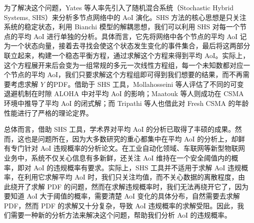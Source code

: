 为了解决这个问题，Yates 等人率先引入了随机混合系统（Stochastic Hybrid Systems, SHS）来分析多节点网络中的 AoI 演化\cite{yates2018age}。SHS 方法的核心思想是只关注系统的稳定状态，利用 Bianchi 模型的解耦思想，我们可以利用 SHS 对每一个节点的平均 AoI 进行单独的分析。具体而言，它先将网络中各个节点的平均 AoI 记为一个状态向量，接着去寻找会使这个状态发生变化的事件集合，最后将这两部分联立起来，构建一个稳态平衡方程，通过求解这个方程来得到平均 AoI。实际上，这个方程展开来后会变为一组常规的多元一次线性方程组，每一个未知数都对应一个节点的平均 AoI，我们只要求解这个方程组即可得到我们想要的结果，而不再需要考虑求解 $Y$ 的PDF。借助于 SHS 工具，Mollahosseini 等人评估了不同的可变退避机制在时隙 ALOHA 中对平均 AoI 的影响\cite{mollahosseini2024effect}；Maatouk 等人则成功在 CSMA 环境中推导了平均 AoI 的闭式解\cite{maatouk2020age}；而 Tripathi 等人也借此对 Fresh CSMA 的年龄性能进行了严格的理论定界\cite{tripathi2023fresh}。

总体而言，借助 SHS 工具，学术界对平均 AoI 的分析已取得了丰硕的成果。然而，这也是问题所在，因为大多数研究的重心都集中在平均 AoI 的分析上，却鲜有专门针对 AoI 违规概率的分析论文。在工业自动化领域、车联网等新型物联网业务中，系统不仅关心信息有多新鲜，还关注 AoI 维持在一个安全阈值内的概率，即对 AoI 的违规概率有要求\cite{fiems2024age}。实际上，SHS 工具并不适用于求解 AoI 违规概率，在利用它求解平均 AoI 时，我们只关注均值，而不关心数据的离散程度，由此绕开了求解 PDF 的问题，然而在求解违规概率时，我们无法再绕开它了，因为要知道 AoI 大于阈值的概率，需要清楚 AoI 变化的具体分布，自然需要去求解 PDF，然而 PDF 的求解又十分复杂，导致 AoI 违规概率的求解受阻。因此，我们需要一种新的分析方法来解决这个问题，帮助我们分析 AoI 的违规概率。

